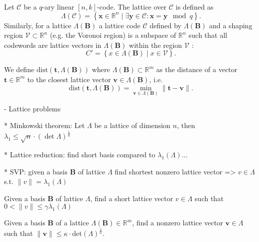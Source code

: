 \documentclass[
  a4paper,  %
  twoside,  %
  bibliography=totoc,
  headsepline,
  cleardoublepage=empty,
  parskip=half,
  draft=false
]{scrbook}
\begin{document}
    Let $\mathcal{C}$ be a $q$-ary linear $[n, k]$-code. The lattice over $\mathcal{C}$ is defined as %
    \begin{equation}
      \Lambda(\mathcal{C}) = \left\{ \mathbf{x} \in \mathbb{R}^n \mid \exists \mathbf{y} \in \mathcal{C} : \mathbf{x} = \mathbf{y} \mod q  \right\}.
    \end{equation} %
    Similarly, for a lattice $\Lambda(\mathbf{B})$ a lattice code $\mathcal{C}$ defined by $\Lambda(\mathbf{B})$ and a shaping region $\mathcal{V} \subset \mathbb{R}^n$ (e.g. the Voronoi region) is a subspace of $\mathbb{R}^n$ such that all codewords are lattice vectors in $\Lambda(\mathbf{B})$ within the region $\mathcal{V}$ \cite{SFS08}:
    \begin{equation}
      C' = \left\{ x \in \Lambda(\mathbf{B}) \mid x \in \mathcal{V} \right\}.
    \end{equation} %



    We define $\text{dist}(\mathbf{t}, \Lambda(\mathbf{B}))$ where $\Lambda(\mathbf{B}) \subset \mathbb{R}^m$ as the distance of a vector $\mathbf{t} \in \mathbb{R}^m$ to the closest lattice vector $\mathbf{v} \in \Lambda(\mathbf{B})$, i.e. 
    \begin{equation}\label{eq:dist}
      \text{dist}(\mathbf{t}, \Lambda(\mathbf{B})) = \min_{\mathbf{v} \in \Lambda(\mathbf{B})}\|\mathbf{t} -  \mathbf{v}\|.
    \end{equation}

    
    

- Lattice problems

  * Minkowski theorem: Let $\Lambda$ be a lattice of dimension $n$, then $\lambda_1 \leq \sqrt{n} \cdot (\det \Lambda)^{\frac{1}{n}}$

  * Lattice reduction: find short basis compared to $\lambda_1(\Lambda)$... 

  * SVP: given a basis $\mathbf{B}$ of lattice $\Lambda$ find shortest nonzero lattice vector =>  $v\in \Lambda$ s.t. $\| v \| = \lambda_1(\Lambda)$

\begin{definition} \label{def:gammaSVP} %
  Given a basis $\mathbf{B}$ of lattice $\Lambda$, find a short lattice vector $v\in \Lambda$ such that $0 < \| v \| \leq \gamma \lambda_1(\Lambda)$
\end{definition}

\begin{definition} \label{def:kappaHSVP} %
  Given a basis $\mathbf{B}$ of a lattice $\Lambda(\mathbf{B}) \in \mathbb{R}^m$, find a nonzero lattice vector $\mathbf{v} \in \Lambda$ such that $\| \mathbf{v} \| \leq \kappa \cdot \text{det}(\Lambda)^{\frac{1}{n}}$. 
\end{definition}
\end{document}
